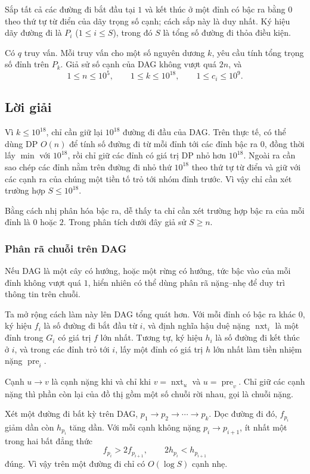 \documentclass[11pt]{article}
\begin{document}
Sắp tất cả các đường đi bắt đầu tại $1$ và kết thúc ở một đỉnh có bậc ra bằng
$0$ theo thứ tự từ điển của dãy trọng số cạnh; cách sắp này là duy nhất. Ký hiệu
dãy đường đi là $P_i$ ($1\le i\le S$), trong đó $S$ là tổng số đường đi thỏa điều
kiện.

Có $q$ truy vấn. Mỗi truy vấn cho một số nguyên dương $k$, yêu cầu tính tổng
trọng số đỉnh trên $P_k$. Giả sử số cạnh của DAG không vượt quá $2n$, và
\[
  1\le n\le 10^5,\qquad 1\le k\le 10^{18},\qquad 1\le c_i\le 10^9 .
\]

\subsection{Lời giải}

Vì $k\le 10^{18}$, chỉ cần giữ lại $10^{18}$ đường đi đầu của DAG. Trên thực tế,
có thể dùng DP $O(n)$ để tính số đường đi từ mỗi đỉnh tới các đỉnh bậc ra $0$,
đồng thời lấy $\min$ với $10^{18}$, rồi chỉ giữ các đỉnh có giá trị DP nhỏ hơn
$10^{18}$. Ngoài ra cần sao chép các đỉnh nằm trên đường đi nhỏ thứ
$10^{18}$ theo thứ tự từ điển và giữ với các cạnh ra của chúng một tiền tố trỏ
tới nhóm đỉnh trước. Vì vậy chỉ cần xét trường hợp $S\le 10^{18}$.

Bằng cách nhị phân hóa bậc ra, dễ thấy ta chỉ cần xét trường hợp bậc ra của mỗi
đỉnh là $0$ hoặc $2$. Trong phân tích dưới đây giả sử $S\ge n$.

\subsubsection{Phân rã chuỗi trên DAG}

Nếu DAG là một cây có hướng, hoặc một rừng có hướng, tức bậc vào của mỗi đỉnh
không vượt quá $1$, hiển nhiên có thể dùng phân rã nặng--nhẹ để duy trì thông
tin trên chuỗi.

Ta mở rộng cách làm này lên DAG tổng quát hơn. Với mỗi đỉnh có bậc ra khác
$0$, ký hiệu \(f_i\) là số đường đi bắt đầu từ \(i\), và định nghĩa hậu duệ nặng
\(\operatorname{nxt}_i\) là một đỉnh trong \(G_i\) có giá trị \(f\) lớn nhất.
Tương tự, ký hiệu \(h_i\) là số đường đi kết thúc ở \(i\), và trong các đỉnh trỏ
tới \(i\), lấy một đỉnh có giá trị \(h\) lớn nhất làm tiền nhiệm nặng
\(\operatorname{pre}_i\).

Cạnh \(u\to v\) là cạnh nặng khi và chỉ khi
\(v=\operatorname{nxt}_u\) và \(u=\operatorname{pre}_v\). Chỉ giữ các cạnh nặng
thì phần còn lại của đồ thị gồm một số chuỗi rời nhau, gọi là chuỗi nặng.

Xét một đường đi bất kỳ trên DAG,
\(p_1\to p_2\to\cdots\to p_k\). Dọc đường đi đó, \(f_{p_i}\) giảm dần còn
\(h_{p_i}\) tăng dần. Với mỗi cạnh không nặng \(p_i\to p_{i+1}\), ít nhất một
trong hai bất đẳng thức
\[
  f_{p_i}>2f_{p_{i+1}},\qquad 2h_{p_i}<h_{p_{i+1}}
\]
đúng. Vì vậy trên một đường đi chỉ có \(O(\log S)\) cạnh nhẹ.
\end{document}
